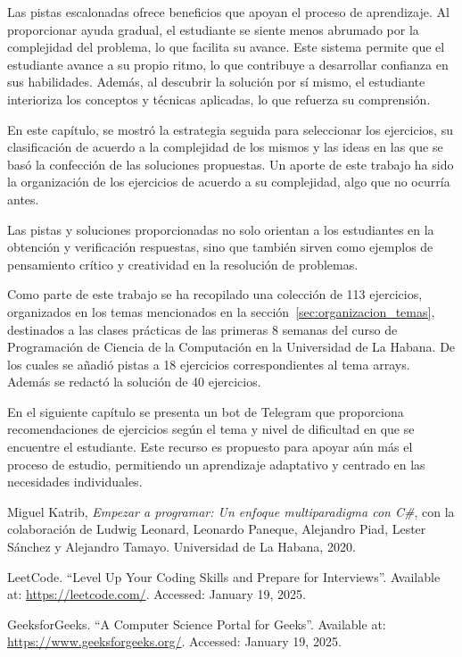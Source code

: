 \documentclass{article}
\begin{document}
Las pistas escalonadas ofrece beneficios que apoyan el proceso de aprendizaje. Al proporcionar ayuda gradual, el estudiante se siente menos abrumado por la complejidad del problema, lo que facilita su avance. Este sistema permite que el estudiante avance a su propio ritmo, lo que contribuye a desarrollar confianza en sus habilidades. Además, al descubrir la solución por sí mismo, el estudiante interioriza los conceptos y técnicas aplicadas, lo que refuerza su comprensión.

En este capítulo, se mostró la estrategia seguida para seleccionar los ejercicios, su clasificación de acuerdo a la complejidad de los mismos y las ideas en las que se basó la confección de las soluciones propuestas. Un aporte de este trabajo ha sido la organización de los ejercicios de acuerdo a su complejidad, algo que no ocurría antes.

Las pistas y soluciones proporcionadas no solo orientan a los estudiantes en la obtención y verificación respuestas, sino que también sirven como ejemplos de pensamiento crítico y creatividad en la resolución de problemas.

Como parte de este trabajo se ha recopilado una colección de 113 ejercicios, organizados en los temas mencionados en la sección~\ref{sec:organizacion_temas}, destinados a las clases prácticas de las primeras 8 semanas del curso de Programación de Ciencia de la Computación en la Universidad de La Habana. De los cuales se añadió pistas a 18 ejercicios correspondientes al tema arrays. Además se redactó la solución de 40 ejercicios.

En el siguiente capítulo se presenta un bot de Telegram que proporciona recomendaciones de ejercicios según el tema y nivel de dificultad en que se encuentre el estudiante. Este recurso es propuesto para apoyar aún más el proceso de estudio, permitiendo un aprendizaje adaptativo y centrado en las necesidades individuales.

\begin{thebibliography}{99}
Miguel Katrib, \textit{Empezar a programar: Un enfoque multiparadigma con C\#}, con la colaboración de Ludwig Leonard, Leonardo Paneque, Alejandro Piad, Lester Sánchez y Alejandro Tamayo. Universidad de La Habana, 2020.

LeetCode. ``Level Up Your Coding Skills and Prepare for Interviews''. Available at: \url{https://leetcode.com/}. Accessed: January 19, 2025.

GeeksforGeeks. ``A Computer Science Portal for Geeks''. Available at: \url{https://www.geeksforgeeks.org/}. Accessed: January 19, 2025.
\end{thebibliography}
\end{document}

